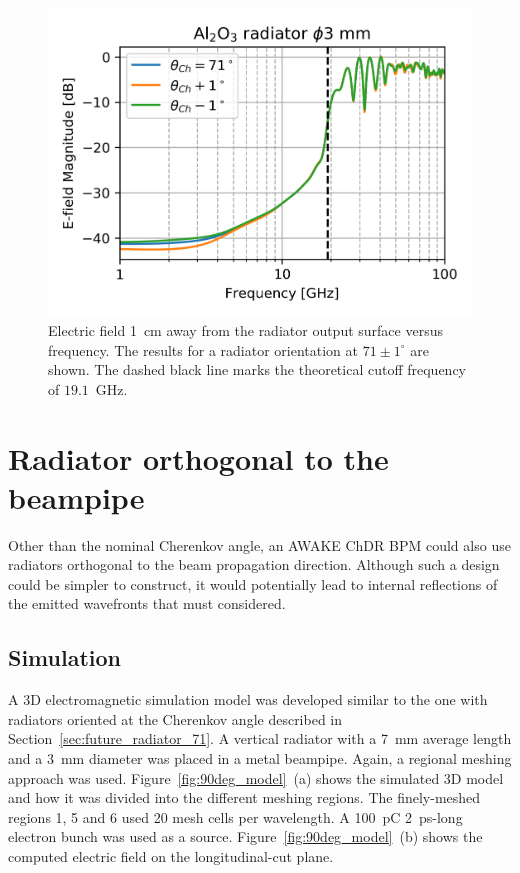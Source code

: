 \begin{figure}[!t]
\centering
\includegraphics[scale=1, keepaspectratio]{pictures/Alumina_3mm_1cm_above_center_normalised}
\caption{Electric field 1~cm away from the radiator output surface versus frequency. The results for a radiator orientation at $71\pm1^\circ$ are shown. The dashed black line marks the theoretical cutoff frequency of $19.1$~GHz.} \label{fig:alumina_cutoff}

\end{figure}










\section[Radiator orthogonal to the beampipe]{Radiator orthogonal to the beampipe}

Other than the nominal Cherenkov angle, an AWAKE ChDR BPM could also use radiators orthogonal to the beam propagation direction. Although such a design could be simpler to construct, it would potentially lead to internal reflections of the emitted wavefronts that must considered. 



\subsection[Simulation]{Simulation}

A 3D electromagnetic simulation model was developed similar to the one with radiators oriented at the Cherenkov angle described in Section~\ref{sec:future_radiator_71}. A vertical radiator with a 7~mm average length and a 3~mm diameter was placed in a metal beampipe. Again, a regional meshing approach was used. Figure~\ref{fig:90deg_model}~(a) shows the simulated 3D model and how it was divided into the different meshing regions. The finely-meshed regions 1, 5 and 6 used 20 mesh cells per wavelength. A 100~pC 2~ps-long electron bunch was used as a source. Figure~\ref{fig:90deg_model}~(b) shows the computed electric field on the longitudinal-cut plane. 

